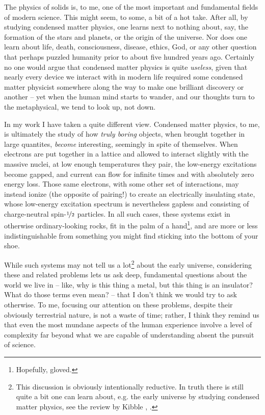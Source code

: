 The physics of solids is, to me, one of the most important and fundamental fields of modern science.
This might seem, to some, a bit of a hot take.
After all, by studying condensed matter physics, one learns next to nothing about, say, the formation of the stars and planets, or the origin of the universe.
Nor does one learn about life, death, consciousness, disease, ethics, God, or any other question that perhaps puzzled humanity prior to about five hundred years ago.
Certainly no one would argue that condensed matter physics is quite \emph{useless}, given that nearly every device we interact with in modern life required some condensed matter physicist somewhere along the way to make one brilliant discovery or another -- yet when the human mind starts to wander, and our thoughts turn to the metaphysical, we tend to look up, not down.

In my work I have taken a quite different view.
Condensed matter physics, to me, is ultimately the study of how \textit{truly boring} objects, when brought together in large quantites, \textit{become} interesting, seemingly in spite of themselves.
When electrons are put together in a lattice and allowed to interact slightly with the massive nuclei, at low enough temperatures they pair, the low-energy excitations become gapped, and current can flow for infinite times and with absolutely zero energy loss.
Those same electrons, with some other set of interactions, may instead ionize (the opposite of pairing!) to create an electrically insulating state, whose low-energy excitation spectrum is nevertheless gapless and consisting of charge-neutral spin-$\nicefrac{1}{2}$ particles.
In all such cases, these systems exist in otherwise ordinary-looking rocks, fit in the palm of a hand\footnote{Hopefully, gloved.}, and are more or less indistinguishable from something you might find sticking into the bottom of your shoe.

While such systems may not tell us a lot\footnote{
    This discussion is obviously intentionally reductive.
    In truth there is still quite a bit one can learn about, e.g. the early universe by studying condensed matter physics, see the review by Kibble \etal, .
}
about the early universe, considering these and related problems lets us ask deep, fundamental questions about the world we live in -- like, why is this thing a metal, but this thing is an insulator? What do those terms even mean? -- that I don't think we would try to ask otherwise.
To me, focusing our attention on these problems, despite their obviously terrestrial nature, is not a waste of time; rather, I think they remind us that even the most mundane aspects of the human experience involve a level of complexity far beyond what we are capable of understanding absent the pursuit of science.

